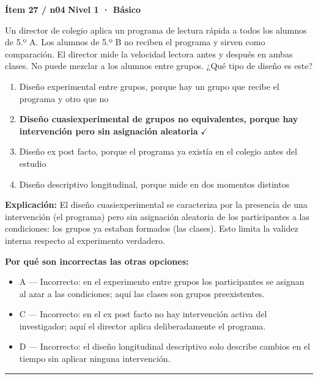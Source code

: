 \documentclass[12pt,a4paper]{article}
\begin{document}
\begin{mdframed}[backgroundcolor=fondogris,linecolor=azul,linewidth=1pt,innerleftmargin=10pt,innerrightmargin=10pt,innertopmargin=7pt,innerbottommargin=7pt]
\textbf{Ítem 27 / n04} \hfill {\small\bfseries\color{azul} Nivel 1 · Básico}
\end{mdframed}

Un director de colegio aplica un programa de lectura rápida a todos los alumnos de 5.º A. Los alumnos de 5.º B no reciben el programa y sirven como comparación. El director mide la velocidad lectora antes y después en ambas clases. No puede mezclar a los alumnos entre grupos. ¿Qué tipo de diseño es este?

\begin{enumerate}
  \item[A.] Diseño experimental entre grupos, porque hay un grupo que recibe el programa y otro que no
  \item[\textbf{\color{verde}B.}] \textbf{\color{verde} Diseño cuasiexperimental de grupos no equivalentes, porque hay intervención pero sin asignación aleatoria} \hfill $\checkmark$
  \item[C.] Diseño ex post facto, porque el programa ya existía en el colegio antes del estudio
  \item[D.] Diseño descriptivo longitudinal, porque mide en dos momentos distintos
\end{enumerate}

\noindent\textbf{\color{azul}Explicación:} El diseño cuasiexperimental se caracteriza por la presencia de una intervención (el programa) pero sin asignación aleatoria de los participantes a las condiciones: los grupos ya estaban formados (las clases). Esto limita la validez interna respecto al experimento verdadero.

\noindent\textbf{\color{gris}Por qué son incorrectas las otras opciones:}
\begin{itemize}
  \item {\small A — Incorrecto: en el experimento entre grupos los participantes se asignan al azar a las condiciones; aquí las clases son grupos preexistentes.}
  \item {\small C — Incorrecto: en el ex post facto no hay intervención activa del investigador; aquí el director aplica deliberadamente el programa.}
  \item {\small D — Incorrecto: el diseño longitudinal descriptivo solo describe cambios en el tiempo sin aplicar ninguna intervención.}
\end{itemize}
\vspace{8pt}\hrule\vspace{10pt}
\end{document}
